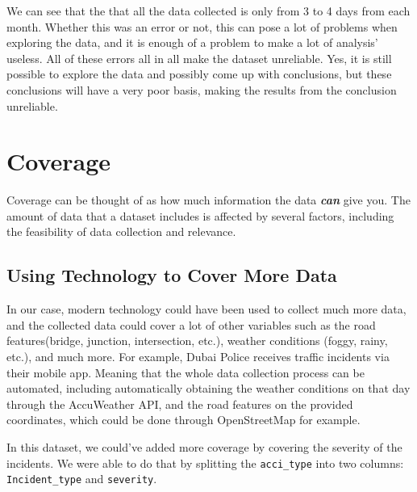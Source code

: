 \documentclass[
]{book}
\newenvironment{Shaded}{\begin{snugshade}}{\end{snugshade}}
\newcommand{\DataTypeTok}[1]{\textcolor[rgb]{0.13,0.29,0.53}{#1}}
\newcommand{\KeywordTok}[1]{\textcolor[rgb]{0.13,0.29,0.53}{\textbf{#1}}}
\newcommand{\NormalTok}[1]{#1}
\newcommand{\OperatorTok}[1]{\textcolor[rgb]{0.81,0.36,0.00}{\textbf{#1}}}
\newcommand{\StringTok}[1]{\textcolor[rgb]{0.31,0.60,0.02}{#1}}
\begin{document}
We can see that the that all the data collected is only from 3 to 4 days from each month. Whether this was an error or not, this can pose a lot of problems when exploring the data, and it is enough of a problem to make a lot of analysis' useless. All of these errors all in all make the dataset unreliable. Yes, it is still possible to explore the data and possibly come up with conclusions, but these conclusions will have a very poor basis, making the results from the conclusion unreliable.

\hypertarget{coverage}{%
\section{Coverage}\label{coverage}}

Coverage can be thought of as how much information the data \textbf{\emph{can}} give you. The amount of data that a dataset includes is affected by several factors, including the feasibility of data collection and relevance.

\hypertarget{using-technology-to-cover-more-data}{%
\subsection{Using Technology to Cover More Data}\label{using-technology-to-cover-more-data}}

In our case, modern technology could have been used to collect much more data, and the collected data could cover a lot of other variables such as the road features(bridge, junction, intersection, etc.), weather conditions (foggy, rainy, etc.), and much more. For example, Dubai Police receives traffic incidents via their mobile app. Meaning that the whole data collection process can be automated, including automatically obtaining the weather conditions on that day through the AccuWeather API, and the road features on the provided coordinates, which could be done through OpenStreetMap for example.

In this dataset, we could've added more coverage by covering the severity of the incidents. We were able to do that by splitting the \texttt{acci\_type} into two columns: \texttt{Incident\_type} and \texttt{severity}.

\begin{Shaded}
\end{Shaded}
\end{document}
